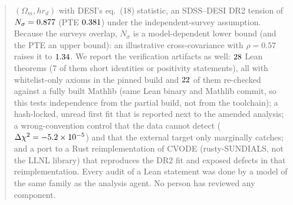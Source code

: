 \documentclass[11pt]{article}
\begin{document}
\begin{abstract}
$(\Omega_m, hr_d)$ with DESI's eq.~(18) statistic, an SDSS--DESI DR2 tension of $N_\sigma=\ebNsig$ (PTE $\ebPTE$) under the independent-survey assumption.
Because the surveys overlap, $N_\sigma$ is a model-dependent lower bound (and the PTE an upper bound): an illustrative cross-covariance
with $\rho=0.57$ raises it to $\roNsigFiftySeven$. We report the verification artifacts as well:
$\lnTotal$ Lean theorems (7 of them short identities or positivity statements), all with whitelist-only axioms in the pinned build and $\lnCleanTwo$ of them re-checked against a fully built Mathlib
(same Lean binary and Mathlib commit, so this tests independence from the partial build, not from the toolchain); a hash-locked, unread first fit that is reported next to the amended analysis; a wrong-convention control that the data cannot
detect ($\Delta\chi^2=\hzNfourChi$) and that the external target only marginally catches; and a port to a Rust reimplementation of CVODE (rusty-SUNDIALS, not the
LLNL library) that reproduces the DR2 fit and exposed defects in that reimplementation. Every audit of a Lean statement was done by a model of the same family as the
analysis agent. No person has reviewed any component.
\end{abstract}
\end{document}
